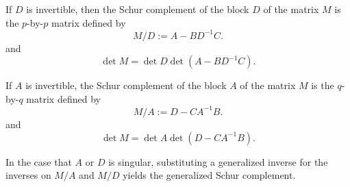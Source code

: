 If $D$ is invertible, then the Schur complement of the block $D$ of the matrix $M$ is the $p$-by-$p$ matrix defined by
\begin{equation}
{\displaystyle M/D:=A - BD^{-1}C.}\label{M/D}
\end{equation}
and $$\det M = \det D \det (A - BD^{-1}C).$$

If $A$ is invertible, the Schur complement of the block $A$ of the matrix $M$ is the $q$-by-$q$ matrix defined by
\begin{equation}
{\displaystyle M/A:=D - CA^{-1}B.}\label{M/A}
\end{equation}
and $$\det M = \det A \det (D - CA^{-1}B).$$

In the case that $A$ or $D$ is singular, substituting a generalized inverse for the inverses on $M/A$ and $M/D$ yields the generalized Schur complement.\\

